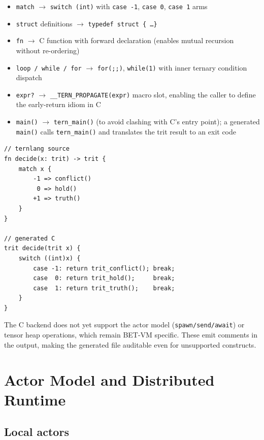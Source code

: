 \documentclass[journal,10pt,twocolumn]{IEEEtran}
\begin{document}
\begin{itemize}
  \item \texttt{match} $\rightarrow$ \texttt{switch (int)} with \texttt{case -1},
        \texttt{case 0}, \texttt{case 1} arms
  \item \texttt{struct} definitions $\rightarrow$ \texttt{typedef struct \{ \ldots \}}
  \item \texttt{fn} $\rightarrow$ C function with forward declaration (enables
        mutual recursion without re-ordering)
  \item \texttt{loop / while / for} $\rightarrow$ \texttt{for(;;)},
        \texttt{while(1)} with inner ternary condition dispatch
  \item \texttt{expr?} $\rightarrow$ \texttt{\_\_TERN\_PROPAGATE(expr)} macro
        slot, enabling the caller to define the early-return idiom in C
  \item \texttt{main()} $\rightarrow$ \texttt{tern\_main()} (to avoid clashing
        with C's entry point); a generated \texttt{main()} calls \texttt{tern\_main()}
        and translates the trit result to an exit code
\end{itemize}

\begin{lstlisting}[caption={Ternlang source and generated C output}]
// ternlang source
fn decide(x: trit) -> trit {
    match x {
        -1 => conflict()
         0 => hold()
        +1 => truth()
    }
}

// generated C
trit decide(trit x) {
    switch ((int)x) {
        case -1: return trit_conflict(); break;
        case  0: return trit_hold();     break;
        case  1: return trit_truth();    break;
    }
}
\end{lstlisting}

The C backend does not yet support the actor model (\texttt{spawn/send/await})
or tensor heap operations, which remain BET-VM specific. These emit comments
in the output, making the generated file auditable even for unsupported constructs.

\section{Actor Model and Distributed Runtime}
\label{sec:actors}

\subsection{Local actors}
\end{document}
